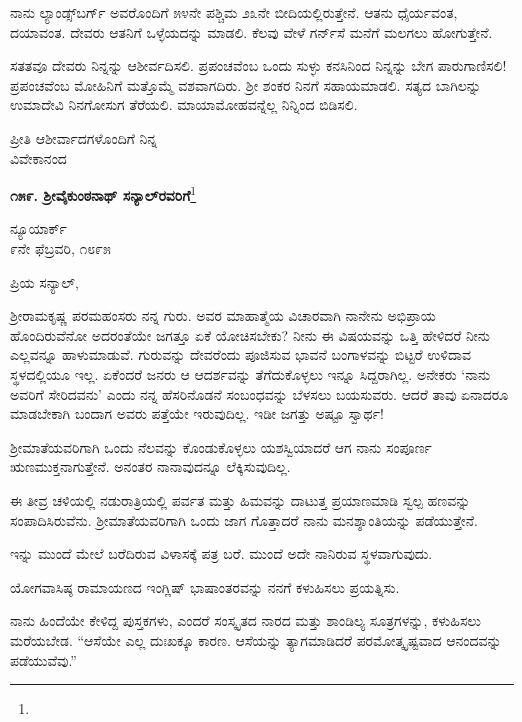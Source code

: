 ನಾನು ಲ್ಯಾಂಡ್ಸ್‌ಬರ್ಗ್ ಅವರೊಂದಿಗೆ ೫೪ನೇ ಪಶ್ಚಿಮ ೨೩ನೇ ಬೀದಿಯಲ್ಲಿರುತ್ತೇನೆ. ಆತನು ಧೈರ್ಯವಂತ, ದಯಾವಂತ. ದೇವರು ಆತನಿಗೆ ಒಳ್ಳೆಯದನ್ನು ಮಾಡಲಿ. ಕೆಲವು ವೇಳೆ ಗರ್ನ್‌ಸೆ ಮನೆಗೆ ಮಲಗಲು ಹೋಗುತ್ತೇನೆ.

\vspace{0.1cm}

ಸತತವೂ ದೇವರು ನಿನ್ನನ್ನು ಆಶೀರ್ವದಿಸಲಿ. ಪ್ರಪಂಚವೆಂಬ ಒಂದು ಸುಳ್ಳು ಕನಸಿನಿಂದ ನಿನ್ನನ್ನು ಬೇಗ ಪಾರುಗಾಣಿಸಲಿ! ಪ್ರಪಂಚವೆಂಬ ಮೋಹಿನಿಗೆ ಮತ್ತೊಮ್ಮೆ ವಶವಾಗದಿರು. ಶ‍್ರೀ ಶಂಕರ ನಿನಗೆ ಸಹಾಯಮಾಡಲಿ. ಸತ್ಯದ ಬಾಗಿಲನ್ನು ಉಮಾದೇವಿ ನಿನಗೋಸುಗ ತೆರೆಯಲಿ. ಮಾಯಾಮೋಹವನ್ನೆಲ್ಲ ನಿನ್ನಿಂದ ಬಿಡಿಸಲಿ.

{\flushright
ಪ್ರೀತಿ ಆಶೀರ್ವಾದಗಳೊಂದಿಗೆ ನಿನ್ನ\\ವಿವೇಕಾನಂದ\par}

\begin{center}
\textbf{೧೫೯. ಶ‍್ರೀವೈಕುಂಠನಾಥ್ ಸನ್ಯಾಲ್‌ರವರಿಗೆ}\footnote{}
\end{center}

\begin{flushright}
ನ್ಯೂಯಾರ್ಕ್\\೯ನೇ ಫೆಬ್ರವರಿ, ೧೮೯೫
\end{flushright}

\noindent
ಪ್ರಿಯ ಸನ್ಯಾಲ್,

ಶ‍್ರೀರಾಮಕೃಷ್ಣ ಪರಮಹಂಸರು ನನ್ನ ಗುರು. ಅವರ ಮಾಹಾತ್ಮೆಯ ವಿಚಾರವಾಗಿ ನಾನೇನು ಅಭಿಪ್ರಾಯ ಹೊಂದಿರುವೆನೋ ಅದರಂತೆಯೇ ಜಗತ್ತೂ ಏಕೆ ಯೋಚಿಸಬೇಕು? ನೀನು ಈ ವಿಷಯವನ್ನು ಒತ್ತಿ ಹೇಳಿದರೆ ನೀನು ಎಲ್ಲವನ್ನೂ ಹಾಳುಮಾಡುವೆ. ಗುರುವನ್ನು ದೇವರೆಂದು ಪೂಜಿಸುವ ಭಾವನೆ ಬಂಗಾಳವನ್ನು ಬಿಟ್ಟರೆ ಉಳಿದಾವ ಸ್ಥಳದಲ್ಲಿಯೂ ಇಲ್ಲ. ಏಕೆಂದರೆ ಜನರು ಆ ಆದರ್ಶವನ್ನು ತೆಗೆದುಕೊಳ್ಳಲು ಇನ್ನೂ ಸಿದ್ದರಾಗಿಲ್ಲ. ಅನೇಕರು `ನಾನು ಅವರಿಗೆ ಸೇರಿದವನು' ಎಂದು ನನ್ನ ಹೆಸರಿನೊಡನೆ ಸಂಬಂಧವನ್ನು ಬೆಳಸಲು ಬಯಸುವರು. ಆದರೆ ತಾವು ಏನಾದರೂ ಮಾಡಬೇಕಾಗಿ ಬಂದಾಗ ಅವರು ಪತ್ತೆಯೇ ಇರುವುದಿಲ್ಲ. ಇಡೀ ಜಗತ್ತು ಅಷ್ಟೂ ಸ್ವಾರ್ಥ!

ಶ‍್ರೀಮಾತೆಯವರಿಗಾಗಿ ಒಂದು ನೆಲವನ್ನು ಕೊಂಡುಕೊಳ್ಳಲು ಯಶಸ್ವಿಯಾದರೆ ಆಗ ನಾನು ಸಂಪೂರ್ಣ ಋಣಮುಕ್ತನಾಗುತ್ತೇನೆ. ಅನಂತರ ನಾನಾವುದನ್ನೂ ಲೆಕ್ಕಿಸುವುದಿಲ್ಲ.

ಈ ತೀವ್ರ ಚಳಿಯಲ್ಲಿ ನಡುರಾತ್ರಿಯಲ್ಲಿ ಪರ್ವತ ಮತ್ತು ಹಿಮವನ್ನು ದಾಟುತ್ತ ಪ್ರಯಾಣಮಾಡಿ ಸ್ವಲ್ಪ ಹಣವನ್ನು ಸಂಪಾದಿಸಿರುವೆನು. ಶ‍್ರೀಮಾತೆಯವರಿಗಾಗಿ ಒಂದು ಜಾಗ ಗೊತ್ತಾದರೆ ನಾನು ಮನಶ್ಶಾಂತಿಯನ್ನು ಪಡೆಯುತ್ತೇನೆ.

ಇನ್ನು ಮುಂದೆ ಮೇಲೆ ಬರೆದಿರುವ ವಿಳಾಸಕ್ಕೆ ಪತ್ರ ಬರೆ. ಮುಂದೆ ಅದೇ ನಾನಿರುವ ಸ್ಥಳವಾಗುವುದು.

ಯೋಗವಾಸಿಷ್ಠ ರಾಮಾಯಣದ ಇಂಗ್ಲಿಷ್ ಭಾಷಾಂತರವನ್ನು ನನಗೆ ಕಳುಹಿಸಲು ಪ್ರಯತ್ನಿಸು.

ನಾನು ಹಿಂದೆಯೇ ಕೇಳಿದ್ದ ಪುಸ್ತಕಗಳು, ಎಂದರೆ ಸಂಸ್ಕೃತದ ನಾರದ ಮತ್ತು ಶಾಂಡಿಲ್ಯ ಸೂತ್ರಗಳನ್ನು, ಕಳುಹಿಸಲು ಮರೆಯಬೇಡ. ``ಆಸೆಯೇ ಎಲ್ಲ ದುಃಖಕ್ಕೂ ಕಾರಣ. ಆಸೆಯನ್ನು ತ್ಯಾಗಮಾಡಿದರೆ ಪರಮೋತ್ಕೃಷ್ಟವಾದ ಆನಂದವನ್ನು ಪಡೆಯುವೆವು.”

